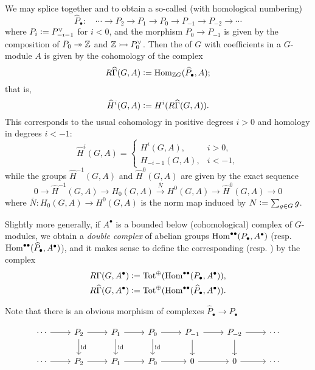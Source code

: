 We may splice together  and
 to obtain a so-called
 (with homological numbering)
\[ \widehat{P}_\bullet\colon \quad
  \cdots \to P_2 \to P_1 \to P_0 \to P_{-1} \to P_{-2} \to \cdots \]
where $P_i \mathrel{\mathop:}= P_{-i-1}^\vee$ for $i < 0$, and the morphism $P_0 \to P_{-1}$ is
given by the composition of $P_0 \twoheadrightarrow \mathbb{Z}$ and $\mathbb{Z} \rightarrowtail P_0^\vee$. Then the
 of $G$ with coefficients in a $G$-module $A$ is given by
the cohomology of the complex
$$R\widehat{\Gamma} (G,A) \mathrel{\mathop:}= \operatorname{Hom}_{\mathbb{Z} G} (\widehat{P}_\bullet, A);$$
that is,
$$\widehat{H}^i (G,A) \mathrel{\mathop:}= H^i (R\widehat{\Gamma} (G,A)).$$
This corresponds to the usual cohomology in positive degrees $i > 0$ and
homology in degrees $i < -1$:
$$\widehat{H}^i (G,A) = \begin{cases}
  H^i (G,A), & i > 0,\\ H_{-i-1} (G,A), & i < -1,
\end{cases}$$ while the groups $\widehat{H}^{-1} (G,A)$ and $\widehat{H}^0
(G,A)$ are given by the exact sequence
\[ 0 \to \widehat{H}^{-1} (G,A) \to H_0 (G,A) \xrightarrow{\overline{N}}
  H^0 (G,A) \to \widehat{H}^0 (G,A) \to 0 \]
where $\overline{N}\colon H_0 (G,A)\to H^0 (G,A)$ is the norm map induced by
$N \mathrel{\mathop:}= \sum_{g\in G} g$.

Slightly more generally, if $A^\bullet$ is a bounded below (cohomological)
complex of $G$-modules, we obtain a \emph{double complex} of abelian groups
$\operatorname{Hom}^{\bullet\bullet} (P_\bullet, A^\bullet)$ (resp.
$\operatorname{Hom}^{\bullet\bullet} (\widehat{P}_\bullet, A^\bullet)$), and it makes sense to
define the corresponding 
(resp. ) by the complex
\begin{align*}
  R\Gamma (G, A^\bullet) & \mathrel{\mathop:}= \operatorname{Tot}^\oplus (\operatorname{Hom}^{\bullet\bullet} (P_\bullet, A^\bullet)), \\
  R\widehat{\Gamma} (G, A^\bullet) & \mathrel{\mathop:}= \operatorname{Tot}^\oplus (\operatorname{Hom}^{\bullet\bullet} (\widehat{P}_\bullet, A^\bullet)).
\end{align*}

Note that there is an obvious morphism of complexes
$\widehat{P}_\bullet \to P_\bullet$

\[ \begin{tikzcd}
    \cdots \ar{r} & P_2 \ar{r}\ar{d}{\idid} & P_1 \ar{r}\ar{d}{\idid} & P_0 \ar{r}\ar{d}{\idid} & P_{-1}\ar{d} \ar{r} & P_{-2} \ar{r}\ar{d} & \cdots \\
    \cdots \ar{r} & P_2 \ar{r} & P_1 \ar{r} & P_0 \ar{r} & 0 \ar{r} & 0 \ar{r} & \cdots
  \end{tikzcd} \]

